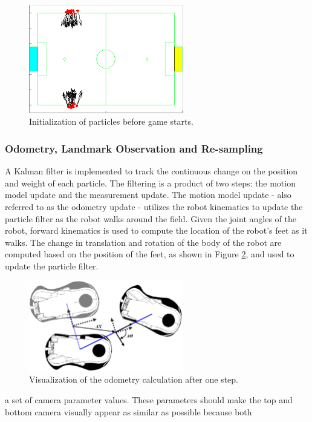 \documentclass{article}
\begin{document}
	\begin{figure}[H]
		\centering
		\includegraphics[width=0.6\textwidth]{figures/InitParticles}    
		\caption{Initialization of particles before game starts.}
		\label{fig:Init}
	\end{figure}

\subsubsection{Odometry, Landmark Observation and Re-sampling}
	A Kalman filter is implemented to track the continuous change on the position and weight of each particle. The filtering is a product of two steps: the motion model update and the measurement update. The motion model update - also referred to as the odometry update - utilizes the robot kinematics to update the particle filter as the robot walks around the field. Given the joint angles of the robot, forward kinematics is used to compute the location of the robot's feet as it walks. The change in translation and rotation of the body of the robot are computed based on the position of the feet, as shown in Figure \ref{fig:odometry}, and used to update the particle filter.

	\begin{figure}[H]
		\centering
		\includegraphics[width=0.6\textwidth]{figures/Odometry.eps}
		\caption{Visualization of the odometry calculation after one step.}
		\label{fig:odometry}
	\end{figure}a set of camera parameter values. These parameters should make the top and bottom camera visually appear as similar as possible because both
\end{document}
